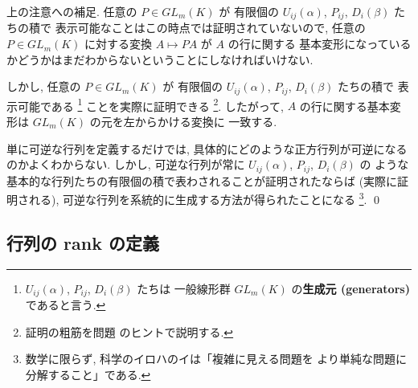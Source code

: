 \documentclass[12pt,twoside]{jarticle}
\begin{document}
\begin{guide}
  \label{guide:elem-tr-2}
  上の注意への補足. 任意の $P\in GL_m(K)$ が
  有限個の $U_{ij}(\alpha)$, $P_{ij}$, $D_i(\beta)$ たちの積で
  表示可能なことはこの時点では証明されていないので, 
  任意の $P\in GL_m(K)$ に対する変換 $A\mapsto PA$ が $A$ の行に関する
  基本変形になっているかどうかはまだわからないということにしなければいけない.

  しかし, 任意の $P\in GL_m(K)$ が
  有限個の $U_{ij}(\alpha)$, $P_{ij}$, $D_i(\beta)$ たちの積で
  表示可能である%
  \footnote{$U_{ij}(\alpha)$, $P_{ij}$, $D_i(\beta)$ たちは
    一般線形群 $GL_m(K)$ の{\bf 生成元 (generators)} であると言う.}%
  ことを実際に証明できる%
  \footnote{証明の粗筋を問題  のヒントで説明する.}. 
  したがって, $A$ の行に関する基本変形は $GL_m(K)$ の元を左からかける変換に
  一致する.

  単に可逆な行列を定義するだけでは, 
  具体的にどのような正方行列が可逆になるのかよくわからない.  
  しかし, 可逆な行列が常に $U_{ij}(\alpha)$, $P_{ij}$, $D_i(\beta)$ の
  ような基本的な行列たちの有限個の積で表わされることが証明されたならば
  (実際に証明される), 可逆な行列を系統的に生成する方法が得られたことになる%
  \footnote{数学に限らず, 科学のイロハのイは「複雑に見える問題を
    より単純な問題に分解すること」である.}.
  \qed
\end{guide}


\subsection{行列の rank の定義}
\label{sec:rank}

\end{document}
